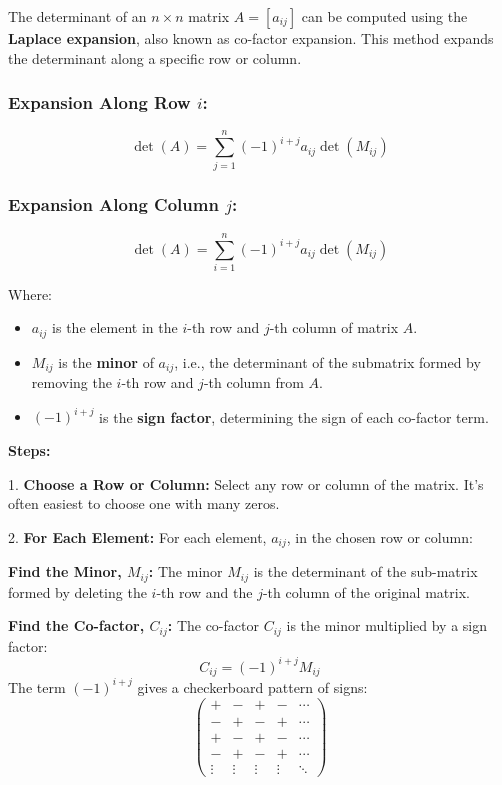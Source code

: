 The determinant of an \( n \times n \) matrix \( A = [a_{ij}] \) can be 
computed using the \textbf{Laplace expansion}, also known as co-factor expansion. 
This method expands the determinant along a specific row or column.

\subsubsection*{Expansion Along Row \( i \):}

\[
\det(A) = \sum_{j=1}^{n} {(-1)}^{i+j} a_{ij} \det(M_{ij})
\]

\subsubsection*{Expansion Along Column \( j \):}

\[
\det(A) = \sum_{i=1}^{n} {(-1)}^{i+j} a_{ij} \det(M_{ij})
\]

Where:

\begin{itemize}[label=\(-\)]
    \item \( a_{ij} \) is the element in the \( i \)-th row and \( j \)-th column of matrix \( A \).
    \item \( M_{ij} \) is the \textbf{minor} of \( a_{ij} \), i.e., the determinant of the submatrix formed by removing the \( i \)-th row and \( j \)-th column from \( A \).
    \item \( {(-1)}^{i+j} \) is the \textbf{sign factor}, determining the sign of each co-factor term.
\end{itemize}

\textbf{Steps:}

1.\textbf{ Choose a Row or Column:} Select any row or column of the matrix.  It's often easiest to choose one with many zeros.

 2.\textbf{ For Each Element:} For each element, \(a_{ij}\), in the chosen row or column:

    \textbf{Find the Minor, \(M_{ij}\):} The minor \(M_{ij}\) is the determinant of the sub-matrix formed by deleting the 
    \indent \(i\)-th row and the \(j\)-th column of the original matrix.

    \textbf{Find the Co-factor, \(C_{ij}\):} The co-factor \(C_{ij}\) is the minor multiplied by a sign factor:
        \[
        C_{ij} = {(-1)}^{i+j} M_{ij}
        \]
        The term  \({(-1)}^{i+j}\)  gives a checkerboard pattern of signs:
        \[
        \begin{pmatrix}
        + & - & + & - & \cdots \\
        - & + & - & + & \cdots \\
        + & - & + & - & \cdots \\
        - & + & - & + & \cdots \\
        \vdots & \vdots & \vdots & \vdots & \ddots
        \end{pmatrix}
        \]

